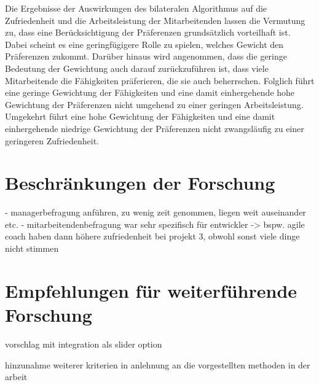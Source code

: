 Die Ergebnisse der Auswirkungen des bilateralen Algorithmus auf die Zufriedenheit und die Arbeitsleistung der Mitarbeitenden lassen die Vermutung zu, dass eine Berücksichtigung der Präferenzen grundsätzlich vorteilhaft ist.
Dabei scheint es eine geringfügigere Rolle zu spielen, welches Gewicht den Präferenzen zukommt.
Darüber hinaus wird angenommen, dass die geringe Bedeutung der Gewichtung auch darauf zurückzuführen ist, dass viele Mitarbeitende die Fähigkeiten präferieren, die sie auch beherrschen.
Folglich führt eine geringe Gewichtung der Fähigkeiten und eine damit einhergehende hohe Gewichtung der Präferenzen nicht umgehend zu einer geringen Arbeitsleistung.
Umgekehrt führt eine hohe Gewichtung der Fähigkeiten und eine damit einhergehende niedrige Gewichtung der Präferenzen nicht zwangsläufig zu einer geringeren Zufriedenheit.





\section{Beschränkungen der Forschung}
- managerbefragung anführen, zu wenig zeit genommen, liegen weit auseinander etc.
- mitarbeitendenbefragung war sehr spezifisch für entwickler -> bspw. agile coach haben dann höhere zufriedenheit bei projekt 3, obwohl sonst viele dinge nicht stimmen

\section{Empfehlungen für weiterführende Forschung}
vorschlag mit integration als slider option

hinzunahme weiterer kriterien in anlehnung an die vorgestellten methoden in der arbeit


